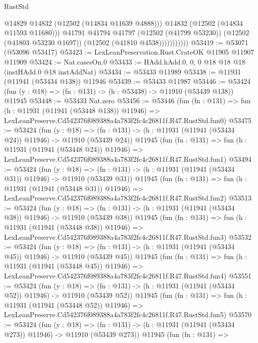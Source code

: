 \begin{lexlean}{RustStd}
\begin{coremodule}
                          @14829
                          @14832
                          (@12502 (@14834 @11639 @4888)))
                        @14832
                        (@12502 (@14834 @11593 @11680)))
                      @41791
                      @41794
                      @41797
                      (@12502 (@41799 @53230))
                      (@12502 (@41803 @53230 @1697))
                      (@12502 (@41810 @4538)))))))))))
@53419 := @53071 (@53096 @53417)
@53423 := LexLeanPreservation.Rust.CrateOK @11905 @11907 @11909
@53424 := Nat.casesOn.{0}
@53433 := HAdd.hAdd.{0, 0, 0} @18 @18 @18 (instHAdd.{0} @18 instAddNat)
@53434 := @53433 @11989
@53438 := @11931 (@11941 (@53434 @138)) @11946
@53439 := @53433 @11987
@53446 := @53424 (fun (y : @18) => (fn : @131) -> (h : @53438) -> @11910 (@53439 @138)) @11945
@53448 := @53433 Nat.zero
@53456 := @53446
    (fun (fn : @131) =>
    fun (h : @11931 (@11941 (@53448 @138)) @11946) =>
    LexLeanPreserve.Cd542376f089388a4a783f2fc4c26811f.R47.RustStd.fun0)
@53475 := @53424
    (fun (y : @18) =>
    (fn : @131) -> (h : @11931 (@11941 (@53434 @24)) @11946) -> @11910 (@53439 @24))
    @11945
    (fun (fn : @131) =>
    fun (h : @11931 (@11941 (@53448 @24)) @11946) =>
    LexLeanPreserve.Cd542376f089388a4a783f2fc4c26811f.R47.RustStd.fun1)
@53494 := @53424
    (fun (y : @18) =>
    (fn : @131) -> (h : @11931 (@11941 (@53434 @31)) @11946) -> @11910 (@53439 @31))
    @11945
    (fun (fn : @131) =>
    fun (h : @11931 (@11941 (@53448 @31)) @11946) =>
    LexLeanPreserve.Cd542376f089388a4a783f2fc4c26811f.R47.RustStd.fun2)
@53513 := @53424
    (fun (y : @18) =>
    (fn : @131) -> (h : @11931 (@11941 (@53434 @38)) @11946) -> @11910 (@53439 @38))
    @11945
    (fun (fn : @131) =>
    fun (h : @11931 (@11941 (@53448 @38)) @11946) =>
    LexLeanPreserve.Cd542376f089388a4a783f2fc4c26811f.R47.RustStd.fun3)
@53532 := @53424
    (fun (y : @18) =>
    (fn : @131) -> (h : @11931 (@11941 (@53434 @45)) @11946) -> @11910 (@53439 @45))
    @11945
    (fun (fn : @131) =>
    fun (h : @11931 (@11941 (@53448 @45)) @11946) =>
    LexLeanPreserve.Cd542376f089388a4a783f2fc4c26811f.R47.RustStd.fun4)
@53551 := @53424
    (fun (y : @18) =>
    (fn : @131) -> (h : @11931 (@11941 (@53434 @52)) @11946) -> @11910 (@53439 @52))
    @11945
    (fun (fn : @131) =>
    fun (h : @11931 (@11941 (@53448 @52)) @11946) =>
    LexLeanPreserve.Cd542376f089388a4a783f2fc4c26811f.R47.RustStd.fun5)
@53570 := @53424
    (fun (y : @18) =>
    (fn : @131) -> (h : @11931 (@11941 (@53434 @273)) @11946) -> @11910 (@53439 @273))
    @11945
    (fun (fn : @131) =>

\end{coremodule}
\end{lexlean}

